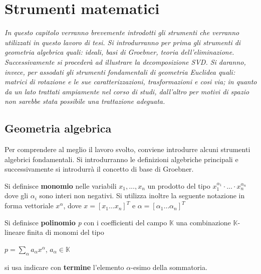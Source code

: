 \chapter{Strumenti matematici}
\label{chap:mat}

\begin{minipage}{12cm}\textit{In questo capitolo verranno brevemente introdotti gli strumenti che verranno utilizzati in questo lavoro di tesi. Si introdurranno per prima gli strumenti di geometria algebrica quali: ideali, basi di Groebner, teoria dell'eliminazione. Successivamente si procederà ad illustrare la decomposizione SVD. Si daranno, invece, per assodati gli strumenti fondamentali di geometria Euclidea quali: matrici di rotazione e le sue caratterizzazioni, trasformazioni e cosi via; in quanto da un lato trattati ampiamente nel corso di studi, dall'altro per motivi di spazio non sarebbe stata possibile una trattazione adeguata.}
\end{minipage}

\vspace*{1cm}

\section{Geometria algebrica}
\label{sec:Geom}

Per comprendere al meglio il lavoro svolto, conviene introdurre alcuni strumenti algebrici fondamentali. Si introdurranno le definizioni algebriche principali e successivamente si introdurrà il concetto di base di Groebner. 

\begin{defn}Si definisce \textbf{monomio} nelle variabili \textit{$x_1, ..., x_n$} un prodotto del tipo $x_1^{\alpha_1} \cdot ... \cdot x_n^{\alpha_n}$ dove gli $\alpha_i$ sono interi non negativi. Si utilizza inoltre la seguente notazione in forma vettoriale \textbf{$x^\alpha$}, dove $x = [x_1 \dots x_n]^T$ e $\alpha = [\alpha_1 \dots \alpha_n]^T$ 	
\end{defn}

\begin{defn}Si definisce \textbf{polinomio} \textit{p} con i coefficienti del campo $\mathbb{K}$ una combinazione $\mathbb{K}$-lineare finita di monomi del tipo
	\begin{center}
		$p = \sum_{\alpha}^{} a_\alpha x^{\alpha}$, $a_\alpha \in \mathbb{K}$
	\end{center}
	si usa indicare con \textbf{termine} l'elemento $\alpha$-esimo della sommatoria.	
\end{defn}

